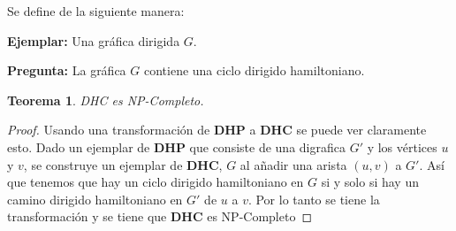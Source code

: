 \documentclass{article}
\newtheorem{theorem}{Teorema}
\begin{document}
Se define de la siguiente manera:

\textbf{Ejemplar:}
Una gráfica dirigida $G$.

\textbf{Pregunta:}
La gráfica $G$ contiene una ciclo dirigido hamiltoniano.

\begin{theorem}
  DHC es NP-Completo.
\end{theorem}
\begin{proof}
  Usando una transformación de \textbf{DHP} a \textbf{DHC} se puede ver claramente esto. Dado un ejemplar de \textbf{DHP} que consiste de una digrafica $G'$ y los vértices $u$ y $v$, se construye un ejemplar de \textbf{DHC}, $G$ al añadir una arista $(u,v)$ a $G'$. Así que tenemos que hay un ciclo dirigido hamiltoniano en $G$ si y solo si hay un camino dirigido hamiltoniano en $G'$ de $u$ a $v$. Por lo tanto se tiene la transformación y se tiene que \textbf{DHC} es NP-Completo
\end{proof}
\end{document}

